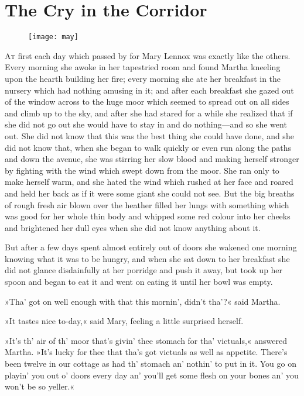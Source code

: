 \chapter{The Cry in the Corridor} 
	
\begin{figure}[t!]
\centering
\texttt{[image: may]}
\end{figure}

 \lettrine[lines=6]{A}{t} first each day which passed by for Mary Lennox was exactly like the others. Every morning she awoke in her tapestried room and found Martha kneeling upon the hearth building her fire; every morning she ate her breakfast in the nursery which had nothing amusing in it; and after each breakfast she gazed out of the window across to the huge moor which seemed to spread out on all sides and climb up to the sky, and after she had stared for a while she realized that if she did not go out she would have to stay in and do nothing—and so she went out. She did not know that this was the best thing she could have done, and she did not know that, when she began to walk quickly or even run along the paths and down the avenue, she was stirring her slow blood and making herself stronger by fighting with the wind which swept down from the moor. She ran only to make herself warm, and she hated the wind which rushed at her face and roared and held her back as if it were some giant she could not see. But the big breaths of rough fresh air blown over the heather filled her lungs with something which was good for her whole thin body and whipped some red colour into her cheeks and brightened her dull eyes when she did not know anything about it.

But after a few days spent almost entirely out of doors she wakened one morning knowing what it was to be hungry, and when she sat down to her breakfast she did not glance disdainfully at her porridge and push it away, but took up her spoon and began to eat it and went on eating it until her bowl was empty.

»Tha' got on well enough with that this mornin', didn't tha'?« said Martha.

»It tastes nice to-day,« said Mary, feeling a little surprised herself.

»It's th' air of th' moor that's givin' thee stomach for tha' victuals,« answered Martha. »It's lucky for thee that tha's got victuals as well as appetite. There's been twelve in our cottage as had th' stomach an' nothin' to put in it. You go on playin' you out o' doors every day an' you'll get some flesh on your bones an' you won't be so yeller.«

